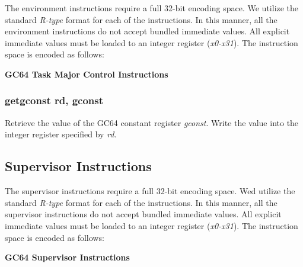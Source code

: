 \documentclass{article}
\begin{document}
The environment instructions require a full 32-bit encoding space.  We utilize 
the standard \emph{R-type} format for each of the instructions.  In this manner, 
all the environment instructions do not accept bundled immediate values.  All
explicit immediate values must be loaded to an integer register (\emph{x0-x31}).  
The instruction space is encoded as follows: 

\begin{center}
\textbf{GC64 Task Major Control Instructions}
\makebox[0.03in][s]{}\makebox[0.03in][s]{}\makebox[0.03in][s]{}\makebox[0.03in][s]{}\makebox[0.03in][s]{}
\end{center}

\subsubsection{getgconst rd, gconst}

Retrieve the value of the GC64 constant register \emph{gconst}.  Write
the value into the integer register specified by \emph{rd}.

\subsection{Supervisor Instructions}

The supervisor instructions require a full 32-bit encoding space.  Wed utilize
the standard \emph{R-type} format for each of the instructions.  In this manner, 
all the supervisor instructions do not accept bundled immediate values.  All
explicit immediate values must be loaded to an integer register (\emph{x0-x31}).
The instruction space is encoded as follows: 

\begin{center}
\textbf{GC64 Supervisor Instructions}
\makebox[0.03in][s]{}\makebox[0.03in][s]{}\makebox[0.03in][s]{}\makebox[0.03in][s]{}\makebox[0.03in][s]{}
\end{center}
\end{document}
